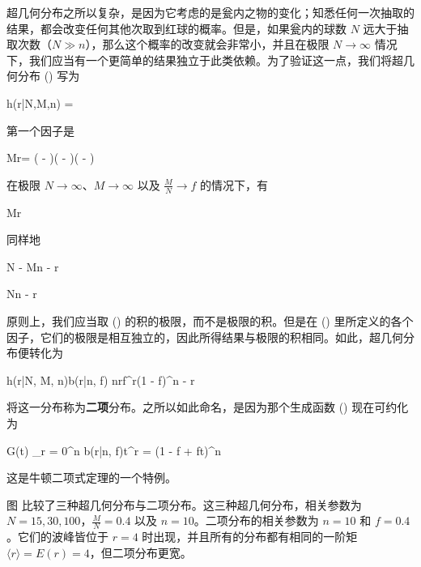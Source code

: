 超几何分布之所以复杂，是因为它考虑的是瓮内之物的变化；知悉任何一次抽取的结果，都会改变任何其他次取到红球的概率。但是，如果瓮内的球数 $N$ 远大于抽取次数（$N \gg n$），那么这个概率的改变就会非常小，并且在极限 $N\rightarrow\infty$ 情况下，我们应当有一个更简单的结果独立于此类依赖。为了验证这一点，我们将超几何分布 (\in[3-22]) 写为

\placeformula[3-81]
\startformula
h(r|N,M,n) = 
\stopformula

第一个因子是

\placeformula[3-82]
\startformula
{}\startpmatrix M\NR r\NR\stoppmatrix = \left( - \right)\left( - \right)\cdots\left( - \right)
\stopformula

在极限 $N\rightarrow\infty$、$M\rightarrow\infty$ 以及 $\frac{M}{N}\rightarrow f$ 的情况下，有

\placeformula[3-83]
\startformula
{}\startpmatrix M\NR r\NR\stoppmatrix\rightarrow{}
\stopformula

同样地

\placeformula[3-84]
\startformula
{}\startpmatrix N - M\NR n - r\NR\stoppmatrix\rightarrow{}
\stopformula

\placeformula[3-85]
\startformula
{}\startpmatrix N\NR n - r\NR\stoppmatrix\rightarrow{}
\stopformula

原则上，我们应当取 (\in[3-81]) 的积的极限，而不是极限的积。但是在 (\in[3-81]) 里所定义的各个因子，它们的极限是相互独立的，因此所得结果与极限的积相同。如此，超几何分布便转化为

\placeformula[3-86]
\startformula
h(r|N, M, n)\rightarrow b(r|n, f) \equiv\startpmatrix n\NR r\NR\stoppmatrix f^r(1 - f)^{n - r}
\stopformula

将这一分布称为{\bf 二项}分布。之所以如此命名，是因为那个生成函数 (\in[3-24]) 现在可约化为

\placeformula[3-87]
\startformula
G(t) \equiv \sum_{r = 0}^n b(r|n, f)t^r = (1 - f + ft)^n
\stopformula

这是牛顿二项式定理的一个特例。

\strut 图 \in[fig-3-1] 比较了三种超几何分布与二项分布。这三种超几何分布，相关参数为 $N = 15, 30, 100$，$\frac{M}{N} = 0.4$ 以及 $n = 10$。二项分布的相关参数为 $n = 10$ 和 $f = 0.4$。它们的波峰皆位于 $r = 4$ 时出现，并且所有的分布都有相同的一阶矩 $\langle r\rangle = E(r) = 4$，但二项分布更宽。

